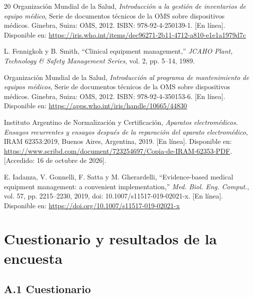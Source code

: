 \documentclass[10pt]{article}
\begin{document}
\begin{thebibliography}{20}
Organización Mundial de la Salud, \emph{Introducción a la gestión de inventarios de equipo médico}, Serie de documentos técnicos de la OMS sobre dispositivos médicos. Ginebra, Suiza: OMS, 2012. ISBN: 978-92-4-250139-1. [En línea]. Disponible en: \url{https://iris.who.int/items/dec96271-2b11-4712-a810-e1e1a1979d7c}

L. Fennigkoh y B. Smith, “Clinical equipment management,” \emph{JCAHO Plant, Technology \& Safety Management Series}, vol. 2, pp. 5--14, 1989.

Organización Mundial de la Salud, \emph{Introducción al programa de mantenimiento de equipos médicos}, Serie de documentos técnicos de la OMS sobre dispositivos médicos. Ginebra, Suiza: OMS, 2012. ISBN: 978-92-4-350153-6. [En línea]. Disponible en: \url{https://apps.who.int/iris/handle/10665/44830}

Instituto Argentino de Normalización y Certificación, \emph{Aparatos electromédicos. Ensayos recurrentes y ensayos después de la reparación del aparato electromédico}, IRAM 62353:2019, Buenos Aires, Argentina, 2019. [En línea]. Disponible en: \url{https://www.scribd.com/document/723254697/Copia-de-IRAM-62353-PDF}. [Accedido: 16 de octubre de 2026].

E. Iadanza, V. Gonnelli, F. Satta y M. Gherardelli, “Evidence-based medical equipment management: a convenient implementation,” \emph{Med. Biol. Eng. Comput.}, vol. 57, pp. 2215--2230, 2019, doi: 10.1007/s11517-019-02021-x. [En línea]. Disponible en: \url{https://doi.org/10.1007/s11517-019-02021-x}

\end{thebibliography}



\newpage
\appendix
\renewcommand{\thesection}{Anexo \Alph{section}}

\section[]{Cuestionario y resultados de la encuesta}
\label{anexo:encuesta}

\subsection*{A.1 Cuestionario}
\end{document}
